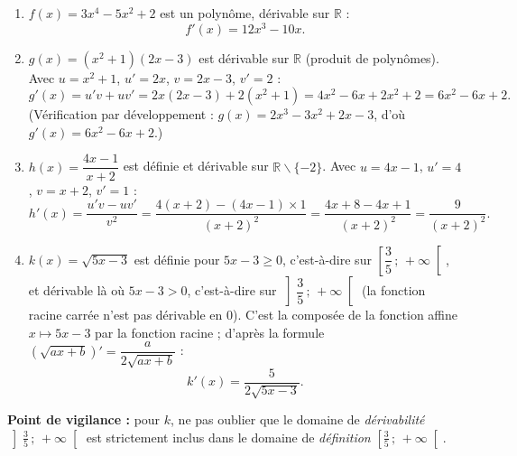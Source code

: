 \documentclass[11pt]{article}
\def\setminus{\mathbin{\backslash}}\let\smallsetminus\setminus
\begin{document}
\begin{corrige}
\begin{enumerate}
    \item $f(x)=3x^4-5x^2+2$ est un polynôme, dérivable sur $\mathbb{R}$ :
    \[
    f'(x)=12x^3-10x.
    \]
    \item $g(x)=(x^2+1)(2x-3)$ est dérivable sur $\mathbb{R}$ (produit de polynômes). Avec $u=x^2+1$, $u'=2x$, $v=2x-3$, $v'=2$ :
    \[
    g'(x)=u'v+uv'=2x(2x-3)+2(x^2+1)=4x^2-6x+2x^2+2=6x^2-6x+2.
    \]
    (Vérification par développement : $g(x)=2x^3-3x^2+2x-3$, d'où $g'(x)=6x^2-6x+2$.)
    \item $h(x)=\dfrac{4x-1}{x+2}$ est définie et dérivable sur $\mathbb{R}\setminus\{-2\}$. Avec $u=4x-1$, $u'=4$, $v=x+2$, $v'=1$ :
    \[
    h'(x)=\frac{u'v-uv'}{v^2}=\frac{4(x+2)-(4x-1)\times 1}{(x+2)^2}=\frac{4x+8-4x+1}{(x+2)^2}=\frac{9}{(x+2)^2}.
    \]
    \item $k(x)=\sqrt{5x-3}$ est définie pour $5x-3\ge 0$, c'est-à-dire sur $\left[\dfrac{3}{5}\,;\,+\infty\right[$, et dérivable là où $5x-3>0$, c'est-à-dire sur $\left]\dfrac{3}{5}\,;\,+\infty\right[$ (la fonction racine carrée n'est pas dérivable en $0$). C'est la composée de la fonction affine $x\mapsto 5x-3$ par la fonction racine ; d'après la formule $(\sqrt{ax+b})'=\dfrac{a}{2\sqrt{ax+b}}$ :
    \[
    k'(x)=\frac{5}{2\sqrt{5x-3}}.
    \]
\end{enumerate}

\textbf{Point de vigilance :} pour $k$, ne pas oublier que le domaine de \emph{dérivabilité} $\left]\frac{3}{5}\,;\,+\infty\right[$ est strictement inclus dans le domaine de \emph{définition} $\left[\frac{3}{5}\,;\,+\infty\right[$.
\end{corrige}
\end{document}
